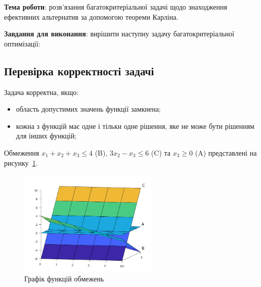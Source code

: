 


\newcommand{\labnumber}{1} %



\usepackage{systeme}
\usepackage{longtable,tabu}
\usepackage{multirow}
\usepackage{array,multirow}
\usepackage{pdflscape}
\usepackage{afterpage}
\usepackage{bm}

\graphicspath{{../figures/}}


\Ukrainian


\addtocounter{page}{1}

\textbf{Тема роботи}: розв'язання багатокритеріальної задачі щодо знаходження ефективних альтернатив за допомогою теореми Карліна.

\textbf{Завдання для виконання}: вирішити наступну задачу багатокритеріальної оптимізації:


\subsection{Перевірка корректності задачі}


Задача корректна, якщо:
\begin{itemize}
    \item область допустимих значень функції замкнена;
    \item кожна з функцій має одне і тільки одне рішення, яке не може бути рішенням для інших функцій;
\end{itemize}

Обмеження $x_1+x_2+x_3 \leq 4$ (B), $3x_2 - x_3 \leq 6$ (C) та $x_3 \geq 0$ (A) представлені на рисунку~\ref{fig:bounds}. 

\begin{figure}[H]
  \centering
    \includegraphics[width=0.6\textwidth]{bounds}
  \caption{Графік функцій обмежень}
  \label{fig:bounds}
\end{figure}

